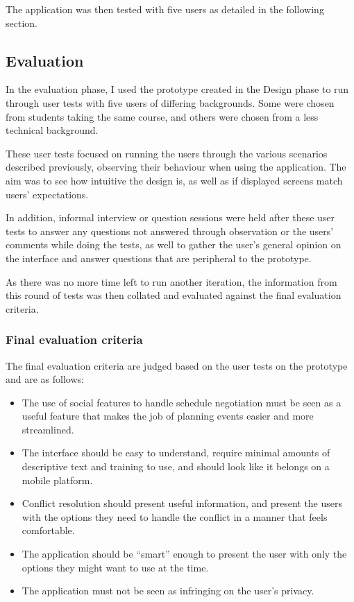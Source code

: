 \documentclass[a4paper,11pt]{report}
\begin{document}
The application was then tested with five users as detailed in the following
section.

\subsection{Evaluation}

In the evaluation phase, I used the prototype created in the Design phase to run
through user tests with five users of differing backgrounds. Some were chosen
from students taking the same course, and others were chosen from a less
technical background.

These user tests focused on running the users through the various scenarios
described previously, observing their behaviour when using the application. The
aim was to see how intuitive the design is, as well as if displayed screens
match users' expectations.

In addition, informal interview or question sessions were held after these user
tests to answer any questions not answered through observation or the users'
comments while doing the tests, as well to gather the user's general opinion on
the interface and answer questions that are peripheral to the prototype.

As there was no more time left to run another iteration, the information from
this round of tests was then collated and evaluated against the final evaluation
criteria.

\subsubsection{Final evaluation criteria}

The final evaluation criteria are judged based on the user tests on the
prototype and are as follows:

\begin{itemize}
\item The use of social features to handle schedule negotiation must be seen
  as a useful feature that makes the job of planning events easier and more
  streamlined.
\item The interface should be easy to understand, require minimal amounts of
  descriptive text and training to use, and should look like it belongs on a
  mobile platform.
\item Conflict resolution should present useful information, and present the
  users with the options they need to handle the conflict in a manner that feels
  comfortable.
\item The application should be ``smart'' enough to present the user with only
  the options they might want to use at the time.
\item The application must not be seen as infringing on the user's privacy.
\end{itemize}
\end{document}
